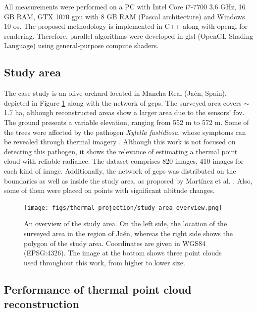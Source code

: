 All measurements were performed on a PC with Intel Core i7-7700 3.6 GHz, 16 GB RAM, GTX 1070 \acrshort{gpu} with 8 GB RAM (Pascal architecture) and Windows 10 \acrshort{os}. The proposed methodology is implemented in C++ along with \acrshort{opengl} for rendering. Therefore, parallel algorithms were developed in \acrshort{glsl} (OpenGL Shading Language) using general-purpose compute shaders. 

\subsection{Study area}

The case study is an olive orchard located in Mancha Real (Jaén, Spain), depicted in Figure \ref{fig:thermal_study_area} along with the network of \acrshort{gcp}s. The surveyed area covers  $\sim$ 1.7 \si{\hectare}, although reconstructed areas show a larger area due to the sensors' \acrshort{fov}. The ground presents a variable elevation, ranging from 552 \si{\meter} to 572 \si{\meter}. Some of the trees were affected by the pathogen \textit{Xylella fastidiosa}, whose symptoms can be revealed through thermal imagery \cite{zarco-tejada_previsual_2018}. Although this work is not focused on detecting this pathogen, it shows the relevance of estimating a thermal point cloud with reliable radiance. The dataset comprises 820 images, 410 images for each kind of image. Additionally, the network of \acrshort{gcp}s was distributed on the boundaries as well as inside the study area, as proposed by Martínez et al. \cite{martinez-carricondo_assessment_2018}. Also, some of them were placed on points with significant altitude changes.

\begin{figure}[ht]
    \centering
    \texttt{[image: figs/thermal\_projection/study\_area\_overview.png]}
    \caption{An overview of the study area. On the left side, the location of the surveyed area in the region of Jaén, whereas the right side shows the polygon of the study area. Coordinates are given in WGS84 (EPSG:4326). The image at the bottom shows three point clouds used throughout this work, from higher to lower size. }
	\label{fig:thermal_study_area}
\end{figure}

\subsection{Performance of thermal point cloud reconstruction}

